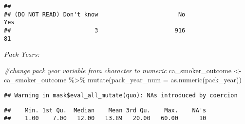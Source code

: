 \documentclass[
]{article}
\newenvironment{Shaded}{\begin{snugshade}}{\end{snugshade}}
\newcommand{\AttributeTok}[1]{\textcolor[rgb]{0.77,0.63,0.00}{#1}}
\newcommand{\CommentTok}[1]{\textcolor[rgb]{0.56,0.35,0.01}{\textit{#1}}}
\newcommand{\FunctionTok}[1]{\textcolor[rgb]{0.00,0.00,0.00}{#1}}
\newcommand{\NormalTok}[1]{#1}
\newcommand{\OtherTok}[1]{\textcolor[rgb]{0.56,0.35,0.01}{#1}}
\newcommand{\SpecialCharTok}[1]{\textcolor[rgb]{0.00,0.00,0.00}{#1}}
\begin{document}
\begin{verbatim}
## 
## (DO NOT READ) Don't know                       No                      Yes 
##                        3                      916                       81
\end{verbatim}

\emph{Pack Years:}

\begin{Shaded}
\begin{Highlighting}[]
\CommentTok{\#change pack year variable from character to numeric}
\NormalTok{ca\_smoker\_outcome }\OtherTok{\textless{}{-}}\NormalTok{ ca\_smoker\_outcome }\SpecialCharTok{\%\textgreater{}\%} \FunctionTok{mutate}\NormalTok{(}\AttributeTok{pack\_year\_num =} \FunctionTok{as.numeric}\NormalTok{(pack\_year))}
\end{Highlighting}
\end{Shaded}

\begin{verbatim}
## Warning in mask$eval_all_mutate(quo): NAs introduced by coercion
\end{verbatim}

\begin{Shaded}
\end{Shaded}

\begin{verbatim}
##    Min. 1st Qu.  Median    Mean 3rd Qu.    Max.    NA's 
##    1.00    7.00   12.00   13.89   20.00   60.00      10
\end{verbatim}
\end{document}
